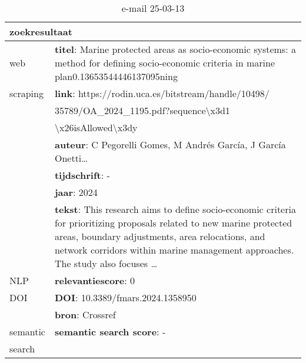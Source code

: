 \begin{table}[h!]
    \caption{e-mail 25-03-13}
    \centering
    \begin{tabularx}{\textwidth}{|p{4cm}|X|} 
        \hline
        \multicolumn{2}{|X|}{\textbf{zoekresultaat}} \\
        \hline
        web &\textbf{titel}: Marine protected areas as socio-economic systems: a method for defining socio-economic criteria in marine plan0.13653544446137095ning\\
        scraping&\textbf{link}: https://rodin.uca.es/bitstream/handle/10498/\\&35789/OA_2024_1195.pdf?sequence\textbackslash x3d1\\&\textbackslash x26isAllowed\textbackslash x3dy\\
        &\textbf{auteur}: C Pegorelli Gomes, M Andrés García, J García Onetti…\\
        &\textbf{tijdschrift}: -\\
        &\textbf{jaar}: 2024\\
        &\textbf{tekst}: This research aims to define socio-economic criteria for prioritizing proposals related to new marine protected areas, boundary adjustments, area relocations, and network corridors within marine management approaches. The study also focuses …\\
        \hline
        NLP&\textbf{relevantiescore}: 0\\
        \hline
        DOI&\textbf{DOI}: 10.3389/fmars.2024.1358950\\
        &\textbf{bron}: Crossref\\
        \hline
        semantic&\textbf{semantic search score}: -\\
        search&\\
        \hline
    \end{tabularx}
    \label{table:email20250313}
\end{table}

